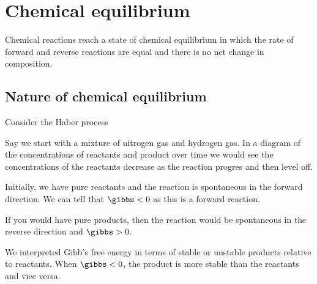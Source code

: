 \documentclass[../mit-general-chemistry.tex]{subfiles}
\begin{document}
\chapter{Chemical equilibrium}





Chemical reactions reach a state of chemical equilibrium in which the
rate of forward and reverse reactions are equal and there is no net
change in composition.


\section{Nature of chemical equilibrium}

Consider the Haber process



Say we start with a mixture of nitrogen gas and hydrogen gas. In a
diagram of the concentrations of reactants and product over time we
would see the concentrations of the reactants decrease as the reaction
progres and then level off.

Initially, we have pure reactants and the reaction is spontaneous in
the forward direction. We can tell that $\gibbs < 0$ as this is a
forward reaction.

\begin{center}
\end{center}


If you would have pure products, then the reaction would be
spontaneous in the reverse direction and $\gibbs > 0$.


We interpreted Gibb's free energy in terms of stable or unstable
products relative to reactants. When $\gibbs < 0$, the product is more
stable than the reactants and vice versa.
\end{document}
